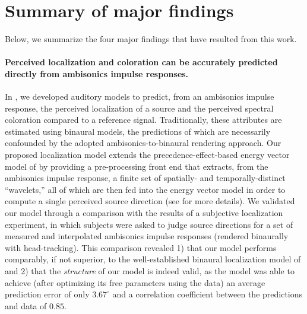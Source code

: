 \section{Summary of major findings}
Below, we summarize the four major findings that have resulted from this work.

\paragraph{Perceived localization and coloration can be accurately predicted directly from ambisonics impulse responses.}
In , we developed auditory models to predict, from an ambisonics impulse response, the perceived localization of a source and the perceived spectral coloration compared to a reference signal.
Traditionally, these attributes are estimated using binaural models, the predictions of which are necessarily confounded by the adopted ambisonics-to-binaural rendering approach.
Our proposed localization model extends the precedence-effect-based energy vector model of \citet{Stitt2016} by providing a pre-processing front end that extracts, from the ambisonics impulse response, a finite set of spatially- and temporally-distinct ``wavelets,'' all of which are then fed into the energy vector model in order to compute a single perceived source direction (see  for more details).
We validated our model through a comparison with the results of a subjective localization experiment, in which subjects were asked to judge source directions for a set of measured and interpolated ambisonics impulse responses (rendered binaurally with head-tracking).
This comparison revealed 1) that our model performs comparably, if not superior, to the well-established binaural localization model of \citet{Dietz2011} and 2) that the \textit{structure} of our model is indeed valid, as the model was able to achieve (after optimizing its free parameters using the data) an average prediction error of only $3.67^\circ$ and a correlation coefficient between the predictions and data of $0.85$.

